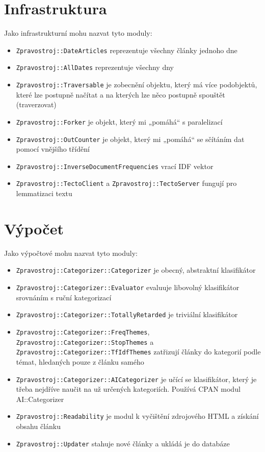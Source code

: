 \documentclass[12pt,a4paper]{report}
\def\uv#1{„#1“}
\begin{document}
\section{Infrastruktura}
Jako infrastrukturní mohu nazvat tyto moduly:

\begin{itemize}
	\item \texttt{Zpravostroj::DateArticles} reprezentuje všechny články jednoho dne
	\item \texttt{Zpravostroj::AllDates} reprezentuje všechny dny
	\item \texttt{Zpravostroj::Traversable} je zobecnění objektu, který má více podobjektů, které lze postupně načítat a na kterých lze něco postupně spouštět (traverzovat)
	\item \texttt{Zpravostroj::Forker} je objekt, který mi \uv{pomáhá} s paralelizací
	\item \texttt{Zpravostroj::OutCounter} je objekt, který mi \uv{pomáhá} se sčítáním dat pomocí vnějšího třídění
	\item \texttt{Zpravostroj::InverseDocumentFrequencies} vrací IDF vektor
	\item \texttt{Zpravostroj::TectoClient} a \texttt{Zpravostroj::TectoServer} fungují pro lemmatizaci textu
\end{itemize}	
	
\section{Výpočet}
Jako výpočtové mohu nazvat tyto moduly:

\begin{itemize}
	\item \texttt{Zpravostroj::Categorizer::Categorizer} je obecný, abstraktní klasifikátor
	\item \texttt{Zpravostroj::Categorizer::Evaluator} evaluuje libovolný klasifikátor srovnáním s ruční kategorizací
	\item \texttt{Zpravostroj::Categorizer::TotallyRetarded} je triviální klasifikátor
	\item \texttt{Zpravostroj::Categorizer::FreqThemes}, \texttt{Zpravostroj::Categorizer::StopThemes} a \texttt{Zpravostroj::Categorizer::TfIdfThemes} zatřizují články do kategorií podle témat, hledaných pouze z článku samého
	\item \texttt{Zpravostroj::Categorizer::AICategorizer} je učící se klasifikátor, který je třeba nejdříve naučit na už určených kategoriích. Používá CPAN modul AI::Categorizer
	\item \texttt{Zpravostroj::Readability} je modul k vyčištění zdrojového HTML a získání obsahu článku
	\item \texttt{Zpravostroj::Updater} stahuje nové články a ukládá je do databáze
\end{itemize}
\end{document}
